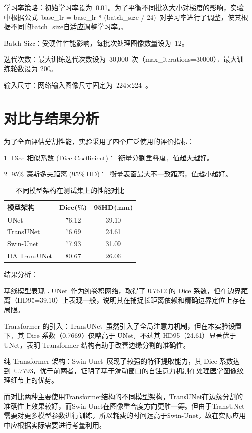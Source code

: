 \documentclass[twoside,openright]{xduugthesis}
\begin{document}
学习率策略：初始学习率设为 0.01。为了平衡不同批次大小对梯度的影响，实验中根据公式 base\_lr = base\_lr * (batch\_size / 24) 对学习率进行了调整，使其根据不同的batch\_size自适应调整学习率。、

Batch Size：受硬件性能影响，每批次处理图像数量设为 12。

迭代次数：最大训练迭代次数设为 30,000 次（max\_iterations=30000），最大训练轮数设为 200。

输入尺寸：网络输入图像尺寸固定为 224×224 。

\section{对比与结果分析}
为了全面评估分割性能，实验采用了四个广泛使用的评价指标：

1. Dice 相似系数 (Dice Coefficient)： 衡量分割重叠度，值越大越好。

2. 95\% 豪斯多夫距离 (95\% HD)： 衡量表面最大不一致距离，值越小越好。

\begin{table}[htbp]
  \centering
  \caption{不同模型架构在测试集上的性能对比}
  \label{tab:model_comparison}
  \begin{tabular}{|l|c|c|}
    \hline
    \textbf{模型架构} & \textbf{Dice(\%)} & \textbf{95HD(mm)} \\
    \hline
    UNet & 76.12 & 39.10 \\
    \hline
    TransUNet & 76.69 & 24.61 \\
    \hline
    Swin-Unet & 77.93 & 31.09 \\
    \hline
    DA-TransUNet & 80.67 & 26.06 \\
    \hline
  \end{tabular}
\end{table}

结果分析：

基线模型表现：UNet 作为纯卷积网络，取得了 0.7612 的 Dice 系数，但在边界距离（HD95=39.10）上表现一般，说明其在捕捉长距离依赖和精确边界定位上存在局限。

Transformer 的引入：TransUNet 虽然引入了全局注意力机制，但在本实验设置下，其 Dice 系数（0.7669）仅略高于 UNet，不过其 HD95（24.61）显著优于 UNet，表明 Transformer 结构有助于改善边缘分割的准确性。

纯 Transformer 架构：Swin-Unet 展现了较强的特征提取能力，其 Dice 系数达到 0.7793，优于前两者，证明了基于滑动窗口的自注意力机制在处理医学图像纹理细节上的优势。

而对比两种主要使用Transformer结构的不同模型架构，TransUNet在边缘分割的准确性上效果较好，而Swin-Unet在图像重合度方向更胜一筹。但由于TransUNet需要对更多模型参数进行训练，所以耗费的时间远高于Swin-Unet，故在实际应用中应根据实际需要进行考量利用。
\end{document}
